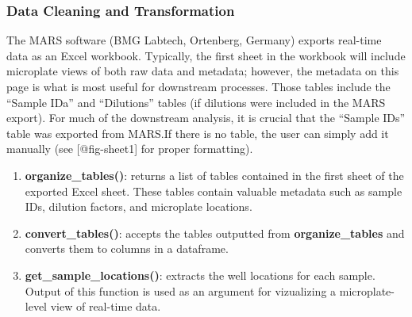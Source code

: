 \documentclass[preprint,12pt, a4paper]{elsarticle}
\begin{document}
    \subsubsection{Data Cleaning and Transformation}
        The MARS software (BMG Labtech, Ortenberg, Germany) exports real-time data as an Excel workbook. Typically, the first sheet in the workbook will include microplate views of both raw data and metadata; however, the metadata on this page is what is most useful for downstream processes. Those tables include the ``Sample IDa'' and ``Dilutions'' tables (if dilutions were included in the MARS export). For much of the downstream analysis, it is crucial that the ``Sample IDs'' table was exported from MARS.\@ If there is no table, the user can simply add it manually (see [@fig-sheet1] for proper formatting).

        \begin{enumerate}
            \item \textbf{organize\_tables()}: returns a list of tables contained in the first sheet of the exported Excel sheet. These tables contain valuable metadata such as sample IDs, dilution factors, and microplate locations.
            \item \textbf{convert\_tables()}: accepts the tables outputted from \textbf{organize\_tables} and converts them to columns in a dataframe.
            \item \textbf{get\_sample\_locations()}: extracts the well locations for each sample. Output of this function is used as an argument for vizualizing a microplate-level view of real-time data.
        \end{enumerate}


\end{document}
